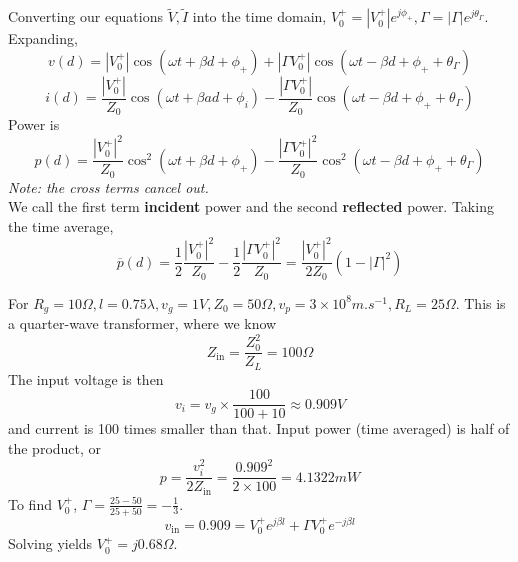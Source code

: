\documentclass[12pt]{article}
\begin{document}
Converting our equations $\tilde V, \tilde I$ into the time domain, $V_0^+ = |V_0^+|e^{j\phi_+}, \Gamma = |\Gamma|e^{j\theta_\Gamma}$. Expanding,
$$v(d) = |V_0^+|\cos(\omega t + \beta d + \phi_+) + |\Gamma V_0^+|\cos(\omega t - \beta d + \phi_+ + \theta_\Gamma)$$
$$i(d) = \frac{|V_0^+|}{Z_0} \cos(\omega t + \beta ad + \phi_i) - \frac{|\Gamma V_0^+|}{Z_0} \cos(\omega t - \beta d + \phi_+ + \theta_\Gamma)$$
Power is
$$p(d) = \frac{|V_0^+|^2}{Z_0} \cos^2(\omega t + \beta d + \phi_+) - \frac{|\Gamma V_0^+|^2}{Z_0} \cos^2(\omega t - \beta d + \phi_+ + \theta_\Gamma)$$
\textit{Note: the cross terms cancel out.} \\
We call the first term \textbf{incident} power and the second \textbf{reflected} power. Taking the time average,
$$\overline p(d) = \frac{1}{2} \frac{|V_0^+|^2}{Z_0} - \frac{1}{2} \frac{|\Gamma V_0^+|^2}{Z_0} = \frac{|V_0^+|^2}{2Z_0} (1 - |\Gamma|^2)$$

\begin{ex}
    For $R_g = 10\unit{\Omega}, l = 0.75\lambda, v_g = 1\unit{V}, Z_0 = 50\unit{\Omega}, v_p = 3 \times 10^8 \unit{m.s^{-1}}, R_L = 25\unit{\Omega}$. This is a quarter-wave transformer, where we know
    $$Z_{\text{in}} = \frac{Z_0^2}{Z_L} = 100\unit{\Omega}$$
    The input voltage is then
    $$v_i = v_g \times \frac{100}{100+10} \approx 0.909\unit{V}$$
    and current is 100 times smaller than that. Input power (time averaged) is half of the product, or 
    $$p = \frac{v_i^2}{2Z_{\text{in}}} = \frac{0.909^2}{2 \times 100} = 4.1322 \unit{mW}$$
    To find $V_0^+$, $\Gamma = \frac{25-50}{25+50} = -\frac{1}{3}$.
    $$v_{\text{in}} = 0.909 = V_0^+ e^{j\beta l} + \Gamma V_0^+ e^{-j\beta l}$$
    Solving yields $V_0^+ = j0.68\unit{\Omega}$.
\end{ex}
\end{document}

